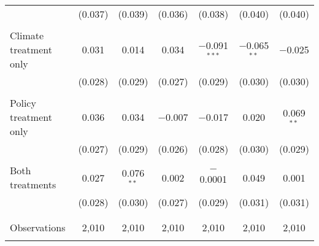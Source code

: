 \begin{tabular}{@{\extracolsep{5pt}}lcccccc}
  & (0.037) & (0.039) & (0.036) & (0.038) & (0.040) & (0.040) \\ 
  & & & & & & \\ 
 Climate treatment only & 0.031 & 0.014 & 0.034 & $-$0.091$^{***}$ & $-$0.065$^{**}$ & $-$0.025 \\ 
  & (0.028) & (0.029) & (0.027) & (0.029) & (0.030) & (0.030) \\ 
  & & & & & & \\ 
 Policy treatment only & 0.036 & 0.034 & $-$0.007 & $-$0.017 & 0.020 & 0.069$^{**}$ \\ 
  & (0.027) & (0.029) & (0.026) & (0.028) & (0.030) & (0.029) \\ 
  & & & & & & \\ 
 Both treatments & 0.027 & 0.076$^{**}$ & 0.002 & $-$0.0001 & 0.049 & 0.001 \\ 
  & (0.028) & (0.030) & (0.027) & (0.029) & (0.031) & (0.031) \\ 
  & & & & & & \\ 
\hline \\[-1.8ex] 

Observations & 2,010 & 2,010 & 2,010 & 2,010 & 2,010 & 2,010 \\ 
\hline 
\hline \\[-1.8ex] 
\end{tabular} 